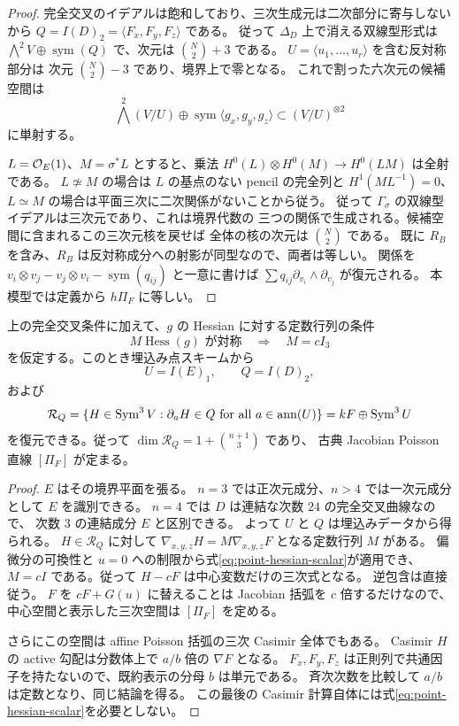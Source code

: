 \begin{proof}
完全交叉のイデアルは飽和しており、三次生成元は二次部分に寄与しないから
$Q=I(D)_2=\langle F_x,F_y,F_z\rangle$ である。
従って $\Delta_D$ 上で消える双線型形式は
$\bigwedge^2V\oplus\operatorname{sym}(Q)$ で、次元は $\binom N2+3$ である。
$U=\langle u_1,\ldots,u_r\rangle$ を含む反対称部分は
次元 $\binom N2-3$ であり、境界上で零となる。
これで割った六次元の候補空間は
\[
 \bigwedge^2(V/U)\oplus
 \operatorname{sym}\langle g_x,g_y,g_z\rangle
 \subset(V/U)^{\otimes2}
\]
に単射する。

$L=\mathcal O_E(1)$、$M=\sigma^*L$ とすると、乗法
$H^0(L)\otimes H^0(M)\to H^0(LM)$ は全射である。
$L\not\simeq M$ の場合は $L$ の基点のない pencil の完全列と
$H^1(ML^{-1})=0$、$L\simeq M$ の場合は平面三次に二次関係がないことから従う。
従って $\Gamma_\sigma$ の双線型イデアルは三次元であり、これは境界代数の
三つの関係で生成される。候補空間に含まれるこの三次元核を戻せば
全体の核の次元は $\binom N2$ である。
既に $R_B$ を含み、$R_B$ は反対称成分への射影が同型なので、両者は等しい。
関係を $v_i\otimes v_j-v_j\otimes v_i-\operatorname{sym}(q_{ij})$ と一意に書けば
$\sum q_{ij}\partial_{v_i}\wedge\partial_{v_j}$ が復元される。
本模型では定義から $h\Pi_F$ に等しい。
\end{proof}

\begin{proposition}[古典 Casimir 空間]\label{prop:point-casimir}
上の完全交叉条件に加えて、$g$ の Hessian に対する定数行列の条件
\begin{equation}\label{eq:point-hessian-scalar}
 M\operatorname{Hess}(g)\text{ が対称}\quad\Longrightarrow\quad M=cI_3
\end{equation}
を仮定する。このとき埋込み点スキームから
\[
 U=I(E)_1,\qquad Q=I(D)_2,
\]
および
\begin{equation}\label{eq:point-casimir}
 \mathcal R_Q=\{H\in\operatorname{Sym}^3V:\partial_aH\in Q\text{ for all }a\in\operatorname{ann}(U)\}
 =kF\oplus\operatorname{Sym}^3U
\end{equation}
を復元できる。従って $\dim\mathcal R_Q=1+\binom{n+1}{3}$ であり、
古典 Jacobian Poisson 直線 $[\Pi_F]$ が定まる。
\end{proposition}

\begin{proof}
$E$ はその境界平面を張る。
$n=3$ では正次元成分、$n>4$ では一次元成分として $E$ を識別できる。
$n=4$ では $D$ は連結な次数 $24$ の完全交叉曲線なので、
次数 $3$ の連結成分 $E$ と区別できる。
よって $U$ と $Q$ は埋込みデータから得られる。
$H\in\mathcal R_Q$ に対して
$\nabla_{x,y,z}H=M\nabla_{x,y,z}F$ となる定数行列 $M$ がある。
偏微分の可換性と $u=0$ への制限から式\eqref{eq:point-hessian-scalar}が適用でき、
$M=cI$ である。従って $H-cF$ は中心変数だけの三次式となる。
逆包含は直接従う。
$F$ を $cF+G(u)$ に替えることは Jacobian 括弧を $c$ 倍するだけなので、
中心空間と表示した三次空間は $[\Pi_F]$ を定める。

さらにこの空間は affine Poisson 括弧の三次 Casimir 全体でもある。
Casimir $H$ の active 勾配は分数体上で $a/b$ 倍の $\nabla F$ となる。
$F_x,F_y,F_z$ は正則列で共通因子を持たないので、既約表示の分母 $b$ は単元である。
斉次次数を比較して $a/b$ は定数となり、同じ結論を得る。
この最後の Casimir 計算自体には式\eqref{eq:point-hessian-scalar}を必要としない。
\end{proof}

